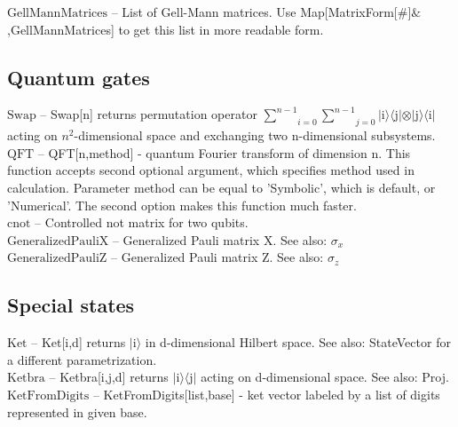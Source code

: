 \noindent\textbf{$ \text{GellMannMatrices} $ }-- List of Gell-Mann matrices. Use Map[MatrixForm[$\#$]$\&$,GellMannMatrices] to get this list in more readable form.$  $\\[6pt]

\subsection{Quantum gates}

\noindent\textbf{$ \text{Swap} $ }-- Swap[n] returns permutation operator $ \underset{i=0}{\overset{n-1}{ \sum }}\underset{j=0}{\overset{n-1}{ \sum }} $$|$i$\rangle \langle $j$|\otimes |$j$\rangle \langle $i$|$ acting on $ n^2 $-dimensional space and exchanging two n-dimensional subsystems.$  $\\[6pt]

\noindent\textbf{$ \text{QFT} $ }-- QFT[n,method] - quantum Fourier transform of dimension n. This function accepts second optional argument, which specifies method used in calculation. Parameter method can be equal to 'Symbolic', which is default, or 'Numerical'. The second option makes this function much faster.$  $\\[6pt]

\noindent\textbf{$ \text{cnot} $ }-- Controlled not matrix for two qubits.$  $\\[6pt]

\noindent\textbf{$ \text{GeneralizedPauliX} $ }-- Generalized Pauli matrix X. See also: $ \sigma _x $\\[6pt]

\noindent\textbf{$ \text{GeneralizedPauliZ} $ }-- Generalized Pauli matrix Z. See also: $ \sigma _z $\\[6pt]

\subsection{Special states}

\noindent\textbf{$ \text{Ket} $ }-- Ket[i,d] returns $|$i$\rangle $ in d-dimensional Hilbert space. See also: StateVector for a different parametrization.$  $\\[6pt]

\noindent\textbf{$ \text{Ketbra} $ }-- Ketbra[i,j,d] returns $|$i$\rangle \langle $j$|$ acting on d-dimensional space. See also: Proj.$  $\\[6pt]

\noindent\textbf{$ \text{KetFromDigits} $ }-- KetFromDigits[list,base] - ket vector labeled by a list of digits represented in given base.$  $\\[6pt]

